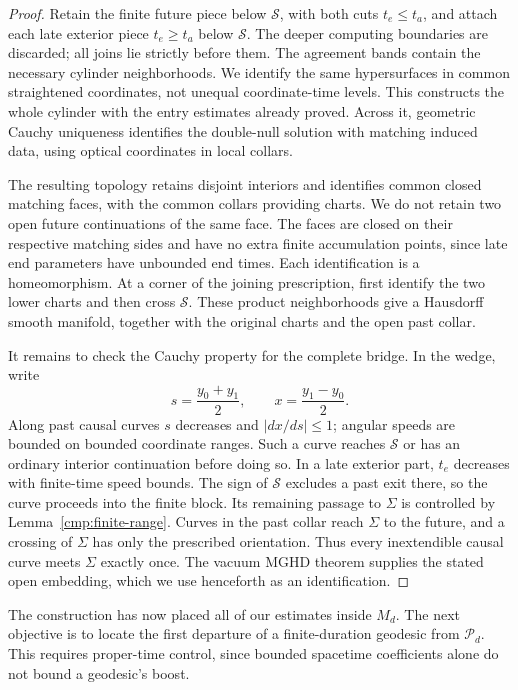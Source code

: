 \begin{proof}
Retain the finite future piece below $\mathcal S$, with both cuts
$t_e\leq t_a$, and attach each late exterior piece $t_e\geq t_a$
below $\mathcal S$. The deeper computing boundaries are discarded;
all joins lie strictly before them. The agreement bands contain the
necessary cylinder neighborhoods. We identify the same hypersurfaces
in common straightened coordinates, not unequal coordinate-time levels.
This constructs the whole cylinder with the entry estimates already
proved. Across it, geometric Cauchy uniqueness identifies the
double-null solution with matching induced data, using optical
coordinates in local collars.

The resulting topology retains disjoint interiors and identifies common
closed matching faces, with the common collars providing charts.
We do not retain two open future continuations of the same face. The
faces are closed on their respective matching sides and have no extra
finite accumulation points, since late end parameters have unbounded
end times. Each identification is a homeomorphism. At a corner of the
joining prescription, first identify the two lower charts and then
cross $\mathcal S$. These product neighborhoods give a Hausdorff smooth
manifold, together with the original charts and the open past collar.

It remains to check the Cauchy property for the complete bridge. In the
wedge, write
\[
 s=\frac{y_0+y_1}{2},\qquad x=\frac{y_1-y_0}{2}.
\]
Along past causal curves $s$ decreases and $|dx/ds|\leq1$; angular
speeds are bounded on bounded coordinate ranges. Such a curve reaches
$\mathcal S$ or has an ordinary interior continuation before doing so.
In a late exterior part, $t_e$ decreases with finite-time speed bounds.
The sign of $\mathcal S$ excludes a past exit there, so the curve
proceeds into the finite block. Its remaining passage to $\Sigma$ is
controlled by Lemma~\ref{cmp:finite-range}. Curves in the past collar
reach $\Sigma$ to the future, and a crossing of $\Sigma$ has only the
prescribed orientation. Thus every inextendible causal curve meets
$\Sigma$ exactly once. The vacuum MGHD theorem supplies the stated
open embedding, which we use henceforth as an identification.
\end{proof}

The construction has now placed all of our estimates inside $M_d$.
The next objective is to locate the first departure of a finite-duration
geodesic from $\mathcal P_d$. This requires proper-time control, since
bounded spacetime coefficients alone do not bound a geodesic's boost.

